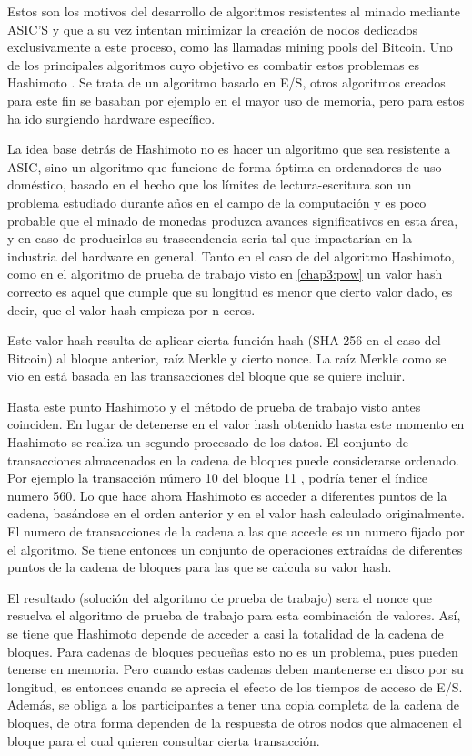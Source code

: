 Estos son los motivos del desarrollo de algoritmos resistentes al minado mediante ASIC’S y que a su vez intentan minimizar la creación de nodos dedicados exclusivamente a este proceso, como las llamadas mining pools del Bitcoin. Uno de los principales algoritmos cuyo objetivo es combatir estos problemas es Hashimoto \citep{dryjahashimoto}. Se trata de un algoritmo basado en E/S, otros algoritmos creados para este fin se basaban por ejemplo en el mayor uso de memoria, pero para estos ha ido surgiendo hardware específico.

 La idea base detrás de Hashimoto no es hacer un algoritmo que sea resistente a ASIC, sino un algoritmo que funcione de forma óptima en ordenadores de uso doméstico, basado en el hecho que los límites de lectura-escritura son un problema estudiado durante años en el campo de la computación y es poco probable que el minado de monedas produzca avances significativos en esta área, y en caso de producirlos su trascendencia seria tal que impactarían en la industria del hardware en general.
Tanto en el caso de del algoritmo Hashimoto, como en el algoritmo de prueba de trabajo visto en \ref{chap3:pow} un valor hash correcto es aquel que cumple que su longitud es menor que cierto valor dado, es decir, que el valor hash empieza por n-ceros.

Este valor hash resulta de aplicar cierta función hash (SHA-256 en el caso del Bitcoin) al bloque anterior, raíz Merkle y cierto nonce. La raíz Merkle como se vio en \label{merkle} está basada en las transacciones del bloque que se quiere incluir. 


Hasta este punto Hashimoto y el método de prueba de trabajo visto antes coinciden. En lugar de detenerse en el valor hash obtenido hasta este momento en Hashimoto se realiza un segundo procesado de los datos. El conjunto de transacciones almacenados en la cadena de bloques puede considerarse ordenado. Por ejemplo la transacción número 10 del bloque 11 , podría tener el índice numero 560. Lo que hace ahora Hashimoto es acceder a diferentes puntos de la cadena, basándose en el orden anterior y en el valor hash calculado originalmente. El numero de transacciones de la cadena a las que accede es un numero fijado por el algoritmo. Se tiene entonces un conjunto de operaciones extraídas de diferentes puntos de la cadena de bloques para las que se calcula su valor hash.


El resultado (solución del algoritmo de prueba de trabajo) sera el nonce que resuelva el algoritmo de prueba de trabajo para esta combinación de valores. Así, se tiene que Hashimoto depende de acceder a casi la totalidad de la cadena de bloques. Para cadenas de bloques pequeñas esto no es un problema, pues pueden tenerse en memoria. Pero cuando estas cadenas deben mantenerse en disco por su longitud, es entonces cuando se aprecia el efecto de los tiempos de acceso de E/S. Además, se obliga a los participantes a tener una copia completa de la cadena de bloques, de otra forma dependen de la respuesta de otros nodos que almacenen el bloque para el cual quieren consultar cierta transacción. 

